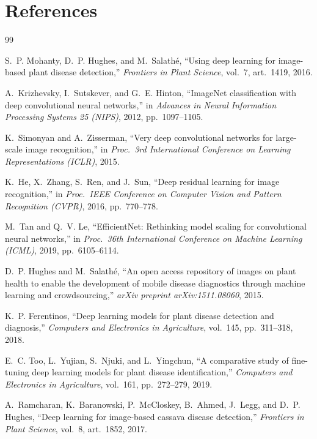 \documentclass[12pt,a4paper]{article}
\begin{document}
\section{References}
\renewcommand{\refname}{}
\vspace{-2.2em}
\begin{thebibliography}{99}

S.~P. Mohanty, D.~P. Hughes, and M.~Salath\'e, ``Using deep learning for
image-based plant disease detection,'' \emph{Frontiers in Plant Science},
vol.~7, art.\ 1419, 2016.

A.~Krizhevsky, I.~Sutskever, and G.~E. Hinton, ``ImageNet classification
with deep convolutional neural networks,'' in \emph{Advances in Neural
Information Processing Systems 25 (NIPS)}, 2012, pp.~1097--1105.

K.~Simonyan and A.~Zisserman, ``Very deep convolutional networks for
large-scale image recognition,'' in \emph{Proc.\ 3rd International
Conference on Learning Representations (ICLR)}, 2015.

K.~He, X.~Zhang, S.~Ren, and J.~Sun, ``Deep residual learning for image
recognition,'' in \emph{Proc.\ IEEE Conference on Computer Vision and
Pattern Recognition (CVPR)}, 2016, pp.~770--778.

M.~Tan and Q.~V. Le, ``EfficientNet: Rethinking model scaling for
convolutional neural networks,'' in \emph{Proc.\ 36th International
Conference on Machine Learning (ICML)}, 2019, pp.~6105--6114.

D.~P. Hughes and M.~Salath\'e, ``An open access repository of images on
plant health to enable the development of mobile disease diagnostics
through machine learning and crowdsourcing,'' \emph{arXiv preprint
arXiv:1511.08060}, 2015.

K.~P. Ferentinos, ``Deep learning models for plant disease detection and
diagnosis,'' \emph{Computers and Electronics in Agriculture}, vol.~145,
pp.~311--318, 2018.

E.~C. Too, L.~Yujian, S.~Njuki, and L.~Yingchun, ``A comparative study of
fine-tuning deep learning models for plant disease identification,''
\emph{Computers and Electronics in Agriculture}, vol.~161, pp.~272--279, 2019.

A.~Ramcharan, K.~Baranowski, P.~McCloskey, B.~Ahmed, J.~Legg, and D.~P.
Hughes, ``Deep learning for image-based cassava disease detection,''
\emph{Frontiers in Plant Science}, vol.~8, art.\ 1852, 2017.


\end{thebibliography}
\end{document}
